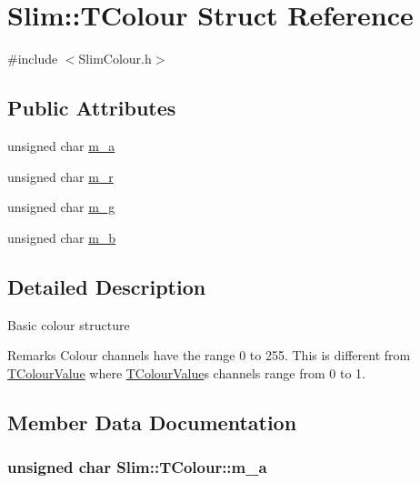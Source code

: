 \hypertarget{struct_slim_1_1_t_colour}{}\section{Slim\+:\+:T\+Colour Struct Reference}
\label{struct_slim_1_1_t_colour}


{\ttfamily \#include $<$Slim\+Colour.\+h$>$}

\subsection*{Public Attributes}
\begin{DoxyCompactItemize}
\item 
unsigned char \hyperlink{struct_slim_1_1_t_colour_ad54de438c697462686efe999506ea680}{m\+\_\+a}
\item 
unsigned char \hyperlink{struct_slim_1_1_t_colour_aea6d46279a9f50ebfeea63e8e77868fc}{m\+\_\+r}
\item 
unsigned char \hyperlink{struct_slim_1_1_t_colour_a2dbe48be2e7d271929c315c4d27dcf1b}{m\+\_\+g}
\item 
unsigned char \hyperlink{struct_slim_1_1_t_colour_a0091d4378739a9a90984540ea47a080c}{m\+\_\+b}
\end{DoxyCompactItemize}


\subsection{Detailed Description}
Basic colour structure \begin{DoxyRemark}{Remarks}
Colour channels have the range 0 to 255. This is different from \hyperlink{struct_slim_1_1_t_colour_value}{T\+Colour\+Value} where \hyperlink{struct_slim_1_1_t_colour_value}{T\+Colour\+Value}\textquotesingle{}s channels range from 0 to 1. 
\end{DoxyRemark}


\subsection{Member Data Documentation}
\hypertarget{struct_slim_1_1_t_colour_ad54de438c697462686efe999506ea680}{}
\subsubsection[{m\+\_\+a}]{\setlength{\rightskip}{0pt plus 5cm}unsigned char Slim\+::\+T\+Colour\+::m\+\_\+a}\label{struct_slim_1_1_t_colour_ad54de438c697462686efe999506ea680}
\hypertarget{struct_slim_1_1_t_colour_a0091d4378739a9a90984540ea47a080c}{}
